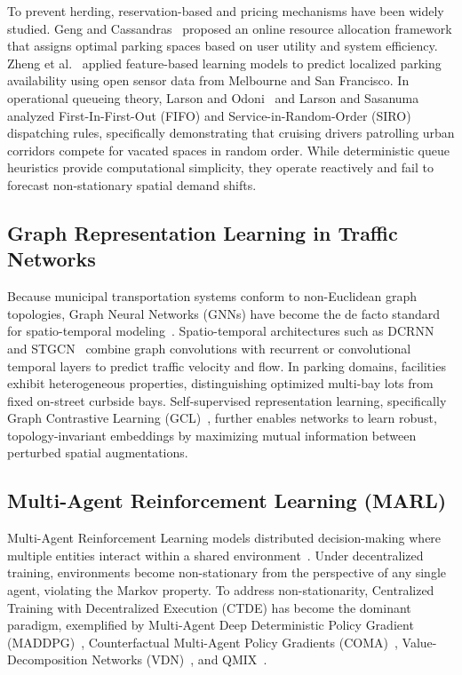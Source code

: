 \documentclass[journal]{IEEEtran}
\begin{document}
To prevent herding, reservation-based and pricing mechanisms have been widely studied. Geng and Cassandras~\cite{geng2013new} proposed an online resource allocation framework that assigns optimal parking spaces based on user utility and system efficiency. Zheng et al.~\cite{zheng2015parking} applied feature-based learning models to predict localized parking availability using open sensor data from Melbourne and San Francisco. In operational queueing theory, Larson and Odoni~\cite{larson2007urban} and Larson and Sasanuma~\cite{larson2010congestion} analyzed First-In-First-Out (FIFO) and Service-in-Random-Order (SIRO) dispatching rules, specifically demonstrating that cruising drivers patrolling urban corridors compete for vacated spaces in random order. While deterministic queue heuristics provide computational simplicity, they operate reactively and fail to forecast non-stationary spatial demand shifts.

\subsection{Graph Representation Learning in Traffic Networks}
Because municipal transportation systems conform to non-Euclidean graph topologies, Graph Neural Networks (GNNs) have become the de facto standard for spatio-temporal modeling~\cite{kipf2017semi,velickovic2018graph}. Spatio-temporal architectures such as DCRNN~\cite{li2018diffusion} and STGCN~\cite{yu2018spatio} combine graph convolutions with recurrent or convolutional temporal layers to predict traffic velocity and flow. In parking domains, facilities exhibit heterogeneous properties, distinguishing optimized multi-bay lots from fixed on-street curbside bays. Self-supervised representation learning, specifically Graph Contrastive Learning (GCL)~\cite{you2020graph,he2020momentum,chen2020simple}, further enables networks to learn robust, topology-invariant embeddings by maximizing mutual information between perturbed spatial augmentations.

\subsection{Multi-Agent Reinforcement Learning (MARL)}
Multi-Agent Reinforcement Learning models distributed decision-making where multiple entities interact within a shared environment~\cite{zhang2021multi,mnih2015human}. Under decentralized training, environments become non-stationary from the perspective of any single agent, violating the Markov property. To address non-stationarity, Centralized Training with Decentralized Execution (CTDE) has become the dominant paradigm, exemplified by Multi-Agent Deep Deterministic Policy Gradient (MADDPG)~\cite{lowe2017multi}, Counterfactual Multi-Agent Policy Gradients (COMA)~\cite{foerster2018counterfactual}, Value-Decomposition Networks (VDN)~\cite{sunehag2018value}, and QMIX~\cite{rashid2018qmix}. 
\end{document}
